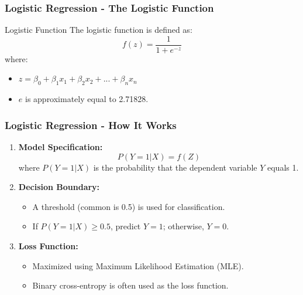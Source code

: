 \documentclass[aspectratio=169]{beamer}
\begin{document}
\begin{frame}[fragile]
    \frametitle{Logistic Regression - The Logistic Function}
    \begin{block}{Logistic Function}
        The logistic function is defined as:
        \begin{equation}
        f(z) = \frac{1}{1 + e^{-z}}
        \end{equation}
        where:
        \begin{itemize}
            \item \( z = \beta_0 + \beta_1 x_1 + \beta_2 x_2 + ... + \beta_n x_n \)
            \item \( e \) is approximately equal to 2.71828.
        \end{itemize}
    \end{block}
\end{frame}

\begin{frame}[fragile]
    \frametitle{Logistic Regression - How It Works}
    \begin{enumerate}
        \item \textbf{Model Specification:}
            \begin{equation}
            P(Y=1 | X) = f(Z)
            \end{equation}
            where \( P(Y=1 | X) \) is the probability that the dependent variable \( Y \) equals 1.
        
        \item \textbf{Decision Boundary:}
            \begin{itemize}
                \item A threshold (common is 0.5) is used for classification.
                \item If \( P(Y=1 | X) \geq 0.5 \), predict \( Y = 1 \); otherwise, \( Y = 0 \).
            \end{itemize}
        
        \item \textbf{Loss Function:}
            \begin{itemize}
                \item Maximized using Maximum Likelihood Estimation (MLE).
                \item Binary cross-entropy is often used as the loss function.
            \end{itemize}
    \end{enumerate}
\end{frame}
\end{document}
